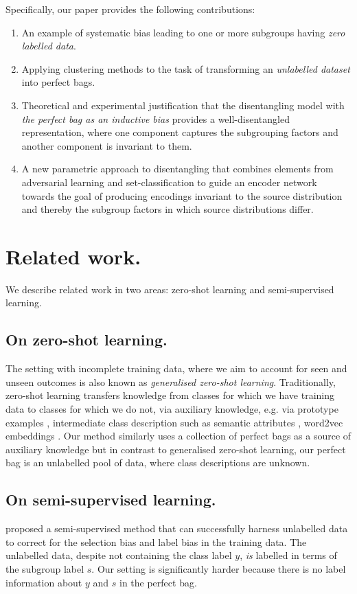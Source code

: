 Specifically, our paper provides the following contributions:
\begin{enumerate}
    \item An example of systematic bias leading to one or more  subgroups having \emph{zero labelled data}.
    \item Applying clustering methods to the task of transforming an \emph{unlabelled dataset} into perfect bags.
    \item Theoretical and experimental justification that the disentangling model with \emph{the perfect bag as an inductive bias} provides a well-disentangled representation, where one component captures the subgrouping factors and another component is invariant to them.
    \item A new parametric approach to disentangling that combines elements from adversarial learning and set-classification to guide an encoder network towards the goal of producing encodings invariant to the source distribution and thereby the subgroup factors in which source distributions differ.
\end{enumerate}

\section{Related work.}
We describe related work in two areas: zero-shot learning and semi-su\-per\-vi\-sed learning.

\subsection{On zero-shot learning.}
The setting with incomplete training data, where we aim to account for seen and unseen outcomes is also known as \emph{generalised zero-shot learning}. 
Traditionally, zero-shot learning transfers knowledge from classes for which we have training data to classes for which we do not, via auxiliary knowledge, e.g. via prototype examples \citep{larochelle2008}, intermediate class description such as semantic attributes \citep{lampert2009, xian2018zero}, word2vec embeddings \citep{bucher2019}. 
Our method similarly uses a collection of perfect bags as a source of auxiliary knowledge but in contrast to generalised zero-shot learning, our perfect bag is an unlabelled pool of data, where class descriptions are unknown. 

\subsection{On semi-supervised learning.} 
\citet{wick2019unlocking} proposed a semi-supervised method that can successfully harness unlabelled data to correct for the selection bias and label bias in the training data.
%
The unlabelled data, despite not containing the class label $y$, \emph{is} labelled in terms of the subgroup label $s$. 
%
Our setting is significantly harder because there is no label information about $y$ and $s$ in the perfect bag.

